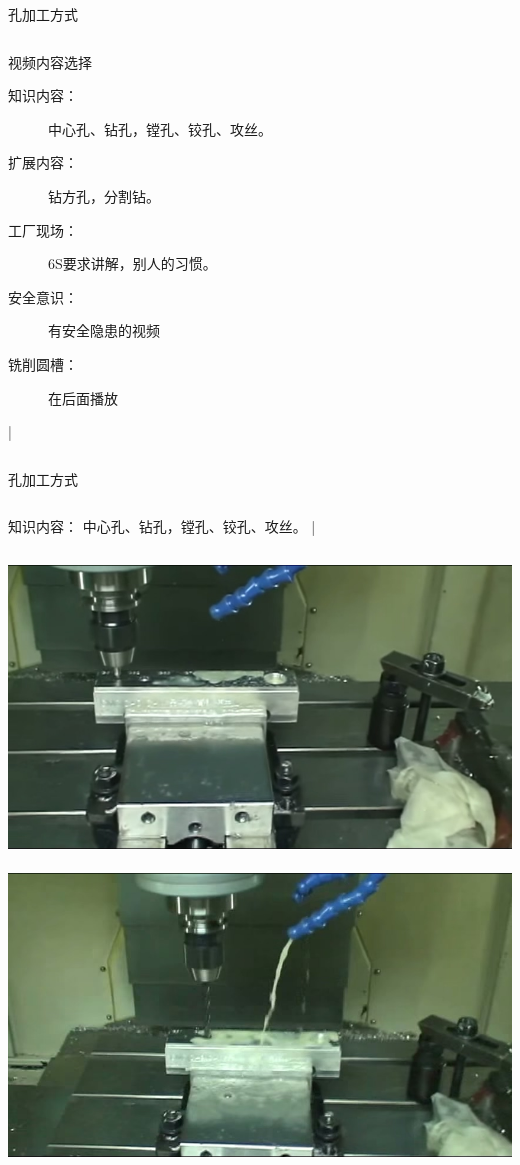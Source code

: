 \documentclass[utf8,zihao=-4,handout,smaller,aspectratio=1610]{ctexbeamer}
\begin{document}
\begin{frame}{孔加工方式}
	\begin{columns}
\begin{block}{视频内容选择}
	\begin{description}
\item[知识内容：]中心孔、钻孔，镗孔、铰孔、攻丝。
\item [扩展内容：]钻方孔，分割钻。

\item [工厂现场：]6S要求讲解，别人的习惯。

\item [安全意识：]有安全隐患的视频

\item [铣削圆槽：]在后面播放
	\end{description}
	|\end{block}		
	
	\end{columns}
\end{frame}

\begin{frame}{孔加工方式}
	\begin{columns}
		\column{.05\textwidth}
		\column{.6\textwidth}
		\begin{block}{知识内容：}
				  中心孔、钻孔，镗孔、铰孔、攻丝。
			|\end{block}


		
		
		\column{.0\textwidth}
	\end{columns}

\vspace{25pt}

\includegraphics[width=0.5\linewidth,trim=0 0 0 0,clip,angle=0]{image/zhongxingkong.jpg}~
\includegraphics[width=0.5\linewidth,trim=0 0 0 0,clip,angle=0]{image/zuankong.jpg}

\end{frame}
\end{document}
